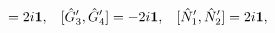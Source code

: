 \begin{equation}
[\hat{G}_{1}^{\prime},\hat{G}_{2}^{\prime}]=2i{\bf 1}, \hspace{0.3cm}
[\hat{G}_{3}^{\prime},\hat{G}_{4}^{\prime}]=-2i{\bf 1},\hspace{0.3cm}
[\hat{N}_{1}^{\prime},\hat{N}_{2}^{\prime}]=2i{\bf 1}, 
\label{6dimplane1}
\end{equation}

